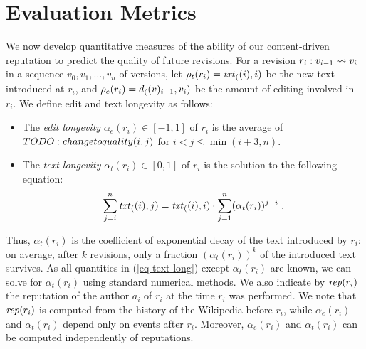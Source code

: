 \section{Evaluation Metrics}
\label{sec-optimize}


\newcommand{\textmass}{\rho_t}
\newcommand{\editmass}{\rho_e} 
\newcommand{\specq}{\alpha}
\newcommand{\especq}{\alpha_e}
\newcommand{\tspecq}{\alpha_t}
\newcommand{\repu}{{\text{\textit{rep}}}}
\def\eqpun{\;}
\newcommand{\prece}{{\text{\textit{prec}}}_e}
\newcommand{\prect}{{\text{\textit{prec}}}_t}
\newcommand{\recall}{{\text{\textit{rec}}}}
\newcommand{\recalle}{{\text{\textit{rec}}}_e}
\newcommand{\recallt}{{\text{\textit{rec}}}_t}
\newcommand{\boost}{{\text{\textit{boost}}}}
\newcommand{\booste}{{\text{\textit{boost}}}_e}
\newcommand{\boostt}{{\text{\textit{boost}}}_t}
\newcommand{\constraint}{\kappa}
\newcommand{\constrainte}{\kappa_e}
\newcommand{\constraintt}{\kappa_t}



We now develop quantitative measures of the ability of our
content-driven reputation to predict the quality of future revisions. 
For a revision $r_i: v_{i-1} \rightsquigarrow v_i$ in a sequence 
$v_0, v_1, \ldots, v_n$ of versions, 
let $\textmass(r_i) = \txt(i,i)$ be the new text introduced at $r_i$, 
and $\editmass(r_i) = \dist(v_{i-1},v_i)$ be the amount of editing
involved in $r_i$. 
We define edit and text longevity as follows: 
%
\begin{itemize} 

\item The {\em edit longevity\/} $\especq(r_i) \in [-1,1]$ of
  $r_i$ is the average of $TODO: change to quality(i,j)$ for $i < j \leq \min(i+3, n)$. 

\item The {\em text longevity\/} $\tspecq(r_i) \in [0,1]$ of
  $r_i$ is the solution to the following equation: 
  \begin{equation} \label{eq-text-long}
    \sum_{j=i}^n \txt(i,j) = \txt(i,i) \cdot \sum_{j=1}^n (\tspecq(r_i))^{j-i}
    \eqpun .
  \end{equation}

\end{itemize}
%
Thus, $\tspecq(r_i)$ is the coefficient of exponential decay of the
text introduced by $r_i$: on average, after $k$ revisions, only a
fraction $(\tspecq(r_i))^k$ of the introduced text survives.
As all quantities in (\ref{eq-text-long}) except $\tspecq(r_i)$ are
known, we can solve for $\tspecq(r_i)$ using standard numerical
methods. 
We also indicate by $\repu(r_i)$ the reputation of the author $a_i$ of
$r_i$ at the time $r_i$ was performed.  
We note that $\repu(r_i)$ is computed from the history of the
Wikipedia before $r_i$, while $\especq(r_i)$ and $\tspecq(r_i)$ depend
only on events after $r_i$. 
Moreover, $\especq(r_i)$ and $\tspecq(r_i)$ can be computed
independently of reputations.

